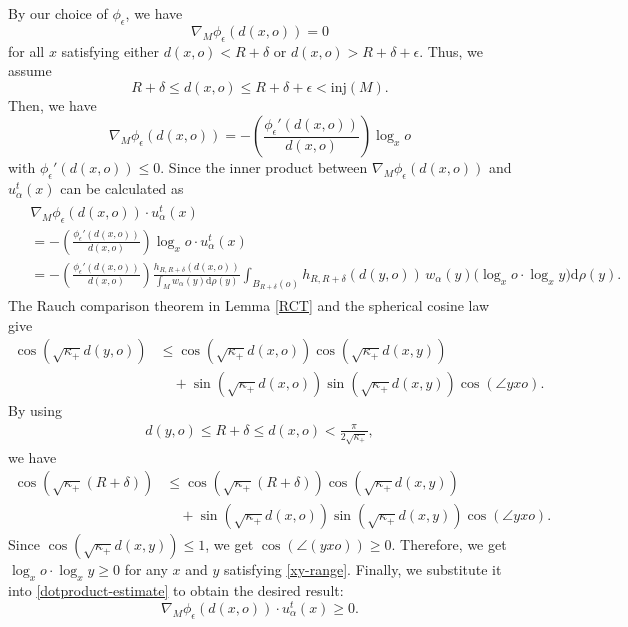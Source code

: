 \documentclass[11pt]{amsart}
\def\d{\mathrm{d}}
\newcommand{\p}{o}%
\newcommand{\dist}{d}%
\newcommand{\inj}{\mathrm{inj}}%
\begin{document}
By our choice of $\phi_\epsilon$, we have
\[
\nabla_M\phi_\epsilon(\dist(x,\p))=0
\]
for all $x$ satisfying either $\dist(x,\p)<R+\delta$ or $\dist(x,\p)>R+\delta+\epsilon$. Thus, we assume
\[
R+\delta\leq \dist(x, \p)\leq R+\delta+\epsilon<\inj(M).
\]
Then, we have
\[
\nabla_M\phi_\epsilon(\dist(x, \p))=-\left(\frac{\phi_\epsilon'(\dist(x, \p))}{\dist(x, \p)}\right)\log_xo
\]
with $\phi_\epsilon'(\dist(x, \p))\leq0$. Since  the inner product between $\nabla_M\phi_\epsilon(\dist(x, \p))$ and $u_\alpha^t(x)$ can be calculated as
\begin{align}\label{dotproduct-estimate}
\begin{aligned}
&\nabla_M\phi_\epsilon(\dist(x, \p))\cdot u_\alpha^t(x)\\
&=-\left(\frac{\phi_\epsilon'(\dist(x, \p))}{\dist(x, \p)}\right)\log_x\p\cdot u_\alpha^t(x)\\
&=-\left(\frac{\phi_\epsilon'(\dist(x, \p))}{\dist(x, \p)}\right)\frac{h_{R,R+\delta}(\dist(x,\p))}{\int_M w_\alpha(y)\d\rho(y)}
\int_{B_{R+\delta}(\p)} h_{R,R+\delta}(\dist(y,\p))\,w_\alpha(y)\big(\log_x\p\cdot\log_x y\big)\d\rho(y).
\end{aligned}
\end{align}
The Rauch comparison theorem in Lemma \ref{RCT}  and the spherical cosine law give 
\begin{align*} 
\cos\left(\sqrt{\kappa_+}\dist(y, \p)\right) &\leq\cos\left(\sqrt{\kappa_+}\dist(x, \p)\right)\cos\left(\sqrt{\kappa_+}\dist(x,y)\right) \\
&\quad +\sin\left(\sqrt{\kappa_+}\dist(x, \p)\right)\sin\left(\sqrt{\kappa_+}\dist(x,y)\right)\cos(\angle yx\p).
\end{align*} 
By using 
\begin{align}\label{xy-range}
\dist(y, \p)\leq R+\delta\leq\dist(x, \p)<\frac{\pi}{2\sqrt{\kappa_+}},
\end{align}
we have
\begin{align*} 
\cos\left(\sqrt{\kappa_+}(R+\delta)\right) &\leq \cos\left(\sqrt{\kappa_+}(R+\delta)\right)\cos\left(\sqrt{\kappa_+}\dist(x, y)\right) \\
&\quad +\sin\left(\sqrt{\kappa_+}\dist(x, \p)\right)\sin\left(\sqrt{\kappa_+}\dist(x,y)\right)\cos(\angle yx\p).
\end{align*} 
Since $\cos(\sqrt{\kappa_+}\dist(x, y))\leq 1$, we get $\cos(\angle(yx\p))\geq0$. Therefore, we get $\log_x\p\cdot\log_xy\geq0$ for any $x$ and $y$ satisfying \eqref{xy-range}. Finally, we substitute it into \eqref{dotproduct-estimate} to obtain the desired result:
\[
\nabla_M\phi_\epsilon(\dist(x, \p))\cdot u_\alpha^t(x)\geq0.
\]
\end{document}
